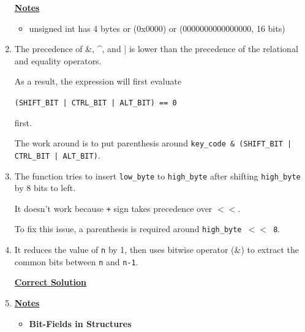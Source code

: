 \documentclass[12pt]{article}
\begin{document}
\begin{enumerate}[1.]
    \bigskip

    \underline{\textbf{Notes}}

    \begin{itemize}
        \item unsigned int has 4 bytes or (0x0000) or (0000000000000000, 16 bits)
    \end{itemize}

    \item

    The precedence of \&, \^{}, and | is lower than the precedence of the relational
    and equality operators.

    \bigskip

    As a result, the expression will first evaluate

    \bigskip

    \texttt{(SHIFT\_BIT | CTRL\_BIT | ALT\_BIT) == 0}

    \bigskip

    first.

    \bigskip

    The work around is to put parenthesis around \texttt{key\_code \& (SHIFT\_BIT | CTRL\_BIT | ALT\_BIT)}.

    \item

    The function tries to insert \texttt{low\_byte} to \texttt{high\_byte} after
    shifting \texttt{high\_byte} by 8 bits to left.

    \bigskip

    It doesn't work because \texttt{+} sign takes precedence over \texttt{$<<$}.

    \bigskip

    To fix this issue, a parenthesis is required around \texttt{high\_byte $<<$ 8}.

    \bigskip

    \item

    It reduces the value of \texttt{n} by 1, then uses bitwise operator (\&) to
    extract the common bits between \texttt{n} and \texttt{n-1}.

    \bigskip

    \begin{mdframed}
    \underline{\textbf{Correct Solution}}

    \bigskip

    \end{mdframed}

    \item

    \bigskip

    \underline{\textbf{Notes}}

    \begin{itemize}
        \item \textbf{Bit-Fields in Structures}
    \end{itemize}

\end{enumerate}
\end{document}
